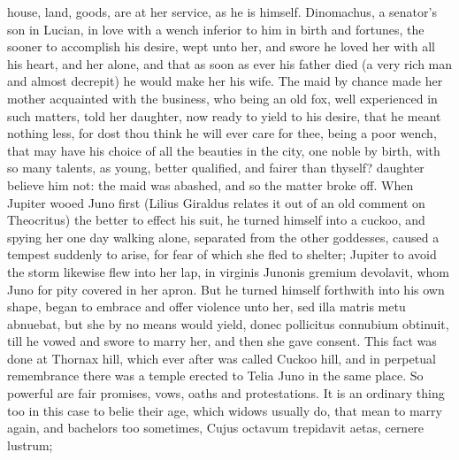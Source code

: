 {house, land, goods, are at her service, as he is himself. Dinomachus, a
senator's son in Lucian, in love with a wench inferior to him in
birth and fortunes, the sooner to accomplish his desire, wept unto her,
and swore he loved her with all his heart, and her alone, and that as
soon as ever his father died (a very rich man and almost decrepit) he
would make her his wife. The maid by chance made her mother acquainted
with the business, who being an old fox, well experienced in such
matters, told her daughter, now ready to yield to his desire, that he
meant nothing less, for dost thou think he will ever care for thee,
being a poor wench, that may have his choice of all the beauties
in the city, one noble by birth, with so many talents, as young, better
qualified, and fairer than thyself? daughter believe him not: the maid
was abashed, and so the matter broke off. When Jupiter wooed Juno first
(Lilius Giraldus relates it out of an old comment on Theocritus) the
better to effect his suit, he turned himself into a cuckoo, and spying
her one day walking alone, separated from the other goddesses, caused a
tempest suddenly to arise, for fear of which she fled to shelter;
Jupiter to avoid the storm likewise flew into her lap, in virginis
Junonis gremium devolavit, whom Juno for pity covered in her
apron. But he turned himself forthwith into his own shape, began
to embrace and offer violence unto her, sed illa matris metu abnuebat,
but she by no means would yield, donec pollicitus connubium obtinuit,
till he vowed and swore to marry her, and then she gave consent. This
fact was done at Thornax hill, which ever after was called Cuckoo hill,
and in perpetual remembrance there was a temple erected to Telia Juno
in the same place. So powerful are fair promises, vows, oaths and
protestations. It is an ordinary thing too in this case to belie their
age, which widows usually do, that mean to marry again, and bachelors
too sometimes,
Cujus octavum trepidavit aetas,
cernere lustrum;

}
